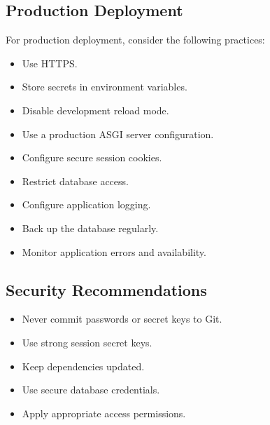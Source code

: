 \documentclass[letterpaper,10pt,english]{sphinxmanual}
\begin{document}
\subsection{Production Deployment}
\label{\detokenize{deployment:production-deployment}}
\sphinxAtStartPar
For production deployment, consider the following practices:
\begin{itemize}
\item {} 
\sphinxAtStartPar
Use HTTPS.

\item {} 
\sphinxAtStartPar
Store secrets in environment variables.

\item {} 
\sphinxAtStartPar
Disable development reload mode.

\item {} 
\sphinxAtStartPar
Use a production ASGI server configuration.

\item {} 
\sphinxAtStartPar
Configure secure session cookies.

\item {} 
\sphinxAtStartPar
Restrict database access.

\item {} 
\sphinxAtStartPar
Configure application logging.

\item {} 
\sphinxAtStartPar
Back up the database regularly.

\item {} 
\sphinxAtStartPar
Monitor application errors and availability.

\end{itemize}


\subsection{Security Recommendations}
\label{\detokenize{deployment:security-recommendations}}\begin{itemize}
\item {} 
\sphinxAtStartPar
Never commit passwords or secret keys to Git.

\item {} 
\sphinxAtStartPar
Use strong session secret keys.

\item {} 
\sphinxAtStartPar
Keep dependencies updated.

\item {} 
\sphinxAtStartPar
Use secure database credentials.

\item {} 
\sphinxAtStartPar
Apply appropriate access permissions.

\end{itemize}
\end{document}
